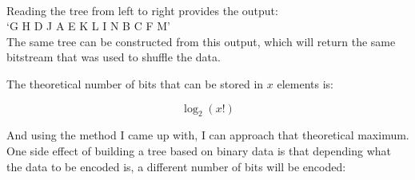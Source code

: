 \documentclass[12pt]{article}
\begin{document}
\vspace{0.4cm}
\\Reading the tree from left to right provides the output:\\
`G H D J A E K L I N B C F M'\\
The same tree can be constructed from this output, which will return the same bitstream that was used to shuffle the data.
\newpage


\vspace{0.5cm}
The theoretical number of bits that can be stored in $x$ elements is:

\[\log_2{(x!)}\]

And using the method I came up with, I can approach that theoretical maximum.
One side effect of building a tree based on binary data is that depending what the data to be encoded is, a different number of bits will be encoded:
\end{document}

